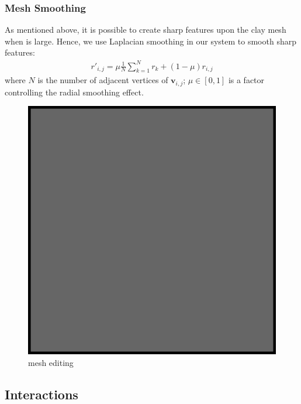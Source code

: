 \subsubsection{Mesh Smoothing}
\label{sec:4.2.4}
As mentioned above, it is possible to create sharp features upon the clay mesh when  is large. Hence, we use Laplacian smoothing in our system to smooth sharp features: 
\begin{equation}
\begin{split}
r'_{i,j} = 
\mu  \frac{1}{N} 
\sum_{k=1}^N r_{k}
+ (1 - \mu)  r_{i,j}
\end{split}
\end{equation}
where $N$ is the number of adjacent vertices of $\mathbf{v}_{i,j}$; $\mu \in [0,1]$ is a factor controlling the radial smoothing effect.

\begin{figure}
  \includegraphics{example.eps}
\caption{mesh editing}
\label{fig:1}       %
\end{figure}

\subsection{Interactions}
\label{sec:4.3}

